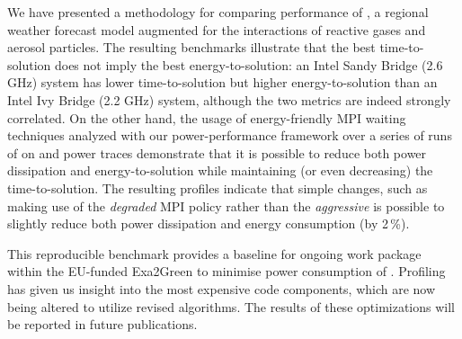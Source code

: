 We  have   presented  a  methodology  for   comparing  performance  of
\cosmoart,  a  regional  weather  forecast  model  augmented  for  the
interactions of  reactive gases and aerosol  particles.  The resulting
benchmarks illustrate  that the  best time-to-solution does  not imply
the best energy-to-solution: an Intel Sandy Bridge (2.6 GHz) system has
lower time-to-solution but higher energy-to-solution than an Intel Ivy
Bridge (2.2 GHz) system, although  the two metrics are indeed strongly
correlated.   On the  other  hand, the  usage  of energy-friendly  MPI
waiting techniques analyzed  with our power-performance framework over
a series of  runs of \cosmoart on \tinto  and power traces demonstrate
that   it  is   possible  to   reduce  both   power   dissipation  and
energy-to-solution   while  maintaining   (or  even   decreasing)  the
time-to-solution. The resulting profiles indicate that simple changes,
such as making use of the  \emph{degraded} MPI policy rather than the \emph{aggressive}
is  possible to  slightly  reduce both  power  dissipation and  energy
consumption (by 2\,\%).

This  reproducible  benchmark provides  a  baseline  for ongoing  work
package within  the EU-funded Exa2Green to  minimise power consumption
of \cosmoart. Profiling  has given us insight into  the most expensive
code  components,  which are  now  being  altered  to utilize  revised
algorithms.  The  results of these  optimizations will be  reported in
future publications.
